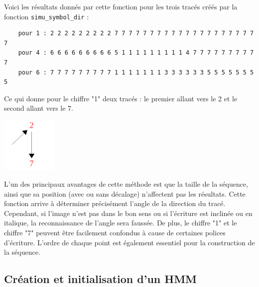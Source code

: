 Voici les résultats donnés par cette fonction pour les trois tracés créés par la fonction \texttt{simu\_symbol\_dir} :
\begin{lstlisting}
	pour 1 : 2 2 2 2 2 2 2 2 2 7 7 7 7 7 7 7 7 7 7 7 7 7 7 7 7 7 7 7 7 7 
	pour 4 : 6 6 6 6 6 6 6 6 6 5 1 1 1 1 1 1 1 1 1 4 7 7 7 7 7 7 7 7 7 7 
	pour 6 : 7 7 7 7 7 7 7 7 7 1 1 1 1 1 1 1 3 3 3 3 3 3 5 5 5 5 5 5 5 5 
\end{lstlisting}
Ce qui donne pour le chiffre "1" deux tracés : le premier allant vers le 2 et le second allant vers le 7.
\begin{center}
	\includegraphics[width=0.20\textwidth]{Figures/direction_results.jpg}
\end{center}

L'un des principaux avantages de cette méthode est que la taille de la séquence, ainsi que sa position (avec ou sans décalage) n'affectent pas les résultats. Cette fonction arrive à déterminer précisément l'angle de la direction du tracé. Cependant, si l'image n'est pas dans le bon sens ou si l'écriture est inclinée ou en italique, la reconnaissance de l'angle sera faussée. De plus, le chiffre "1" et le chiffre "7" peuvent être facilement confondus à cause de certaines polices d'écriture. L'ordre de chaque point est également essentiel pour la construction de la séquence.


\subsection{Création et initialisation d'un HMM}

